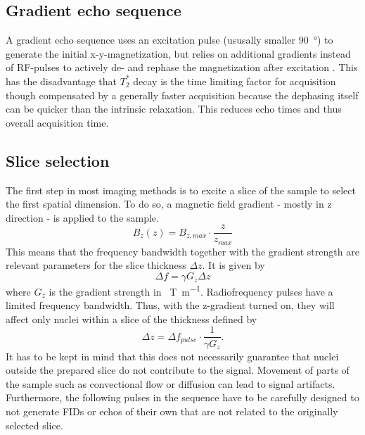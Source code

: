         \subsection{Gradient echo sequence}
            A gradient echo sequence uses an excitation pulse (ususally smaller \SI{90}{\degree}) to generate the initial x-y-magnetization, but relies on additional gradients instead of RF-pulses to actively de- and rephase the magnetization  after excitation \cite{brown_mri_2005}. This has the disadvantage that $T_2^*$ decay is the time limiting factor for acquisition though compensated by a generally faster acquisition because the dephasing itself can be quicker than the intrinsic relaxation. This reduces echo times and thus overall acquisition time.
        \subsection{Slice selection}
        \label{section:theory:sliceSelection}
            The first step in most imaging methods is to excite a slice of the sample to select the first spatial dimension. To do so, a magnetic field gradient - mostly in z direction - is applied to the sample. 
            \begin{equation}
                B_z(z) = B_{z,max} \cdot \frac{z}{z_{max}}
            \end{equation}
            This means that the frequency bandwidth together with the gradient strength are relevant parameters for the slice thickness $\Delta z$. It is given by 
            \begin{equation}
                \Delta f = \gamma G_z \Delta z
            \end{equation}
            where $G_z$ is the gradient strength in \SI{}{\tesla\per\meter}.
            Radiofrequency pulses have a limited frequency bandwidth. Thus, with the z-gradient turned on, they will affect only nuclei within a slice of the thickness defined by
            \begin{equation}
                \Delta z = \Delta f_{pulse} \cdot \frac{1}{\gamma G_z}.
            \end{equation}
             It has to be kept in mind that this does not necessarily guarantee that nuclei outside the prepared slice do not contribute to the signal. Movement of parts of the sample such as convectional flow or diffusion can lead to signal artifacts. Furthermore, the following pulses in the sequence have to be carefully designed to not generate FIDs or echos of their own that are not related to the originally selected slice.
